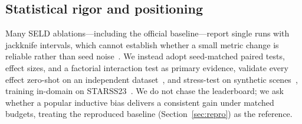 \subsection{Statistical rigor and positioning}
Many SELD ablations---including the official baseline---report single runs with
jackknife intervals, which cannot establish whether a small metric change is
reliable rather than seed noise~\cite{bouthillier2021variance}. We instead adopt
seed-matched paired tests, effect sizes, and a factorial interaction test as
primary evidence, validate every effect zero-shot on an independent
dataset~\cite{politis2022starss22}, and stress-test on synthetic
scenes~\cite{politis2021nigens}, training in-domain on
STARSS23~\cite{shimada2023starss23}. We do not chase the leaderboard; we ask
whether a popular inductive bias delivers a consistent gain under matched budgets,
treating the reproduced baseline (Section~\ref{sec:repro}) as the reference.
